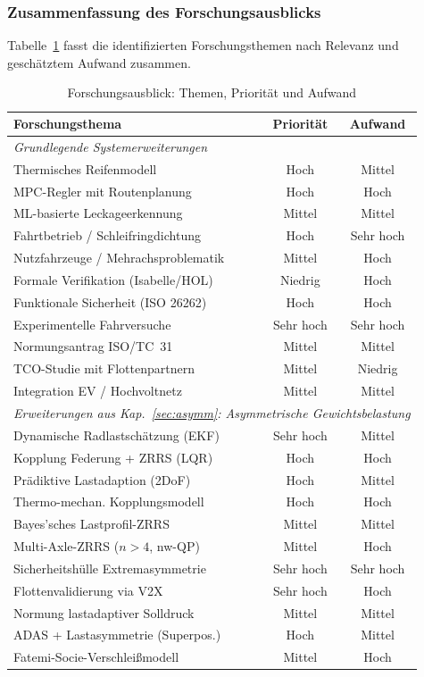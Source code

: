 ﻿\documentclass[a4paper,12pt]{article}
\theoremstyle{definition}
\begin{document}
\subsubsection{Zusammenfassung des Forschungsausblicks}

Tabelle~\ref{tab:forschungsausblick} fasst die identifizierten
Forschungsthemen nach Relevanz und geschätztem Aufwand zusammen.

\begin{table}[H]
\centering
\caption{Forschungsausblick: Themen, Priorität und Aufwand}
\label{tab:forschungsausblick}
\begin{tabular}{p{5.5cm}cc}
\toprule
\textbf{Forschungsthema} & \textbf{Priorität} & \textbf{Aufwand} \\
\midrule
\multicolumn{3}{l}{\textit{Grundlegende Systemerweiterungen}} \\
Thermisches Reifenmodell & Hoch & Mittel \\
MPC-Regler mit Routenplanung & Hoch & Hoch \\
ML-basierte Leckageerkennung & Mittel & Mittel \\
Fahrtbetrieb / Schleifringdichtung & Hoch & Sehr hoch \\
Nutzfahrzeuge / Mehrachsproblematik & Mittel & Hoch \\
Formale Verifikation (Isabelle/HOL) & Niedrig & Hoch \\
Funktionale Sicherheit (ISO 26262) & Hoch & Hoch \\
Experimentelle Fahrversuche & Sehr hoch & Sehr hoch \\
Normungsantrag ISO/TC~31 & Mittel & Mittel \\
TCO-Studie mit Flottenpartnern & Mittel & Niedrig \\
Integration EV / Hochvoltnetz & Mittel & Mittel \\
\midrule
\multicolumn{3}{l}{\textit{Erweiterungen aus Kap.~\ref{sec:asymm}: Asymmetrische Gewichtsbelastung}} \\
Dynamische Radlastschätzung (EKF) & Sehr hoch & Mittel \\
Kopplung Federung + ZRRS (LQR) & Hoch & Hoch \\
Prädiktive Lastadaption (2DoF) & Hoch & Mittel \\
Thermo-mechan. Kopplungsmodell & Hoch & Hoch \\
Bayes'sches Lastprofil-ZRRS & Mittel & Mittel \\
Multi-Axle-ZRRS ($n > 4$, nw-QP) & Mittel & Hoch \\
Sicherheitshülle Extremasymmetrie & Sehr hoch & Sehr hoch \\
Flottenvalidierung via V2X & Sehr hoch & Hoch \\
Normung lastadaptiver Solldruck & Mittel & Mittel \\
ADAS + Lastasymmetrie (Superpos.) & Hoch & Mittel \\
Fatemi-Socie-Verschleißmodell & Mittel & Hoch \\
\bottomrule
\end{tabular}
\end{table}
\end{document}
